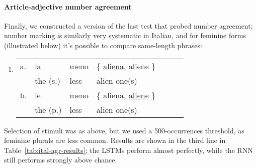 \paragraph{Article-adjective number agreement}
Finally, we constructed a version of the last test that probed number agreement; number marking is similarly very systematic in Italian, and for feminine forms (illustrated below) it's possible to compare same-length phrases:
\begin{enumerate}[label={(\arabic*)}]
	\item 
\begin{tabular}[t]{lllllll}
	a. & la & meno & \{ \underline{aliena}, aliene \} \\
   &  the (s.)& less & alien one(s)  \\
	b. & le & meno & \{ aliena, \underline{aliene} \} \\
    &the (p.)& less & alien one(s) \\
\end{tabular}
\end{enumerate}
Selection of stimuli was as above, but we used a 500-occurrences
threshold, as feminine plurals are less common. %
Results are shown in the third line in Table~\ref{tab:ital-agr-results}; the LSTMs perform almost perfectly, while the RNN still performs strongly above chance.

